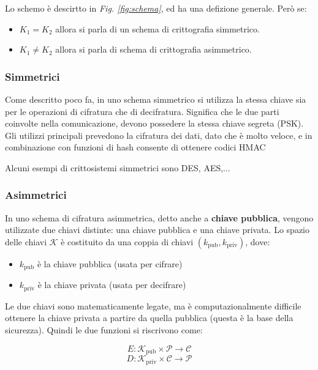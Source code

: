 \noindent
Lo schemo è descirtto in \textit{Fig. \ref{fig:schema}}, ed ha una defizione generale. Però se:
\begin{itemize}
    \item $K_1 = K_2$ allora si parla di un schema di crittografia simmetrico.
    \item $K_1 \neq K_2$ allora si parla di schema di crittografia asimmetrico.
\end{itemize}

\subsubsection{Simmetrici}

Come descritto poco fa, in uno schema simmetrico si utilizza la stessa chiave sia per le operazioni di cifratura che di decifratura. 
Significa che le due parti coinvolte nella comunicazione, devono possedere la stessa chiave segreta (PSK).\\
Gli utilizzi principali prevedono la cifratura dei dati, dato che è molto veloce, e in combinazione con funzioni di hash consente di ottenere codici HMAC

Alcuni esempi di crittosistemi simmetrici sono DES, AES,...



\subsubsection{Asimmetrici}

In uno schema di cifratura asimmetrica, detto anche a \textbf{chiave pubblica}, vengono utilizzate due chiavi distinte: una chiave pubblica e una chiave privata.
Lo spazio delle chiavi \(\mathcal{K}\) è costituito da una coppia di chiavi \((k_{\text{pub}}, k_{\text{priv}})\), dove:

\begin{itemize}
    \item \(k_{\text{pub}}\) è la chiave pubblica (usata per cifrare) 
    \item \(k_{\text{priv}}\) è la chiave privata (usata per decifrare)    
\end{itemize}

\noindent
Le due chiavi sono matematicamente legate, ma è computazionalmente difficile ottenere la chiave privata a partire da quella pubblica (questa è la base della sicurezza).
Quindi le due funzioni si riscrivono come:

\begin{equation}
    E: \mathcal{K}_{\text{pub}} \times \mathcal{P} \to \mathcal{C}
\end{equation}
\begin{equation}
    D: \mathcal{K}_{\text{priv}} \times \mathcal{C} \to \mathcal{P}
\end{equation}

